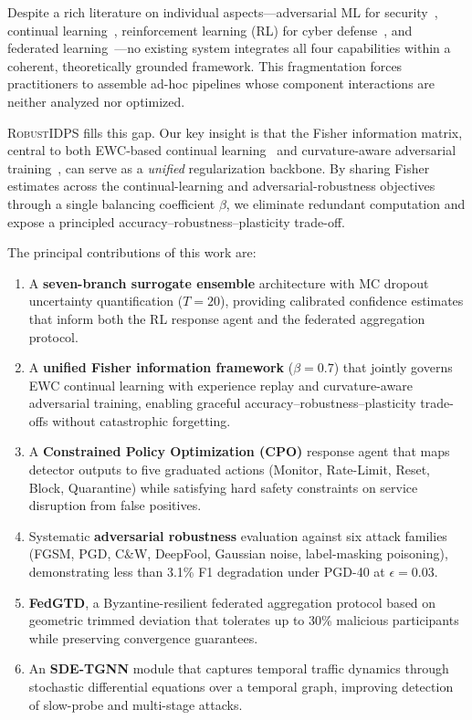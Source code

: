 \documentclass[journal,twoside]{IEEEtran}
\begin{document}
Despite a rich literature on individual aspects---adversarial ML for
security~\cite{apruzzese2023real}, continual
learning~\cite{delange2021continual}, reinforcement learning (RL) for cyber
defense~\cite{nguyen2021deep}, and federated
learning~\cite{mcmahan2017communication}---no existing system integrates all
four capabilities within a coherent, theoretically grounded framework. This
fragmentation forces practitioners to assemble ad-hoc pipelines whose
component interactions are neither analyzed nor optimized.

\textsc{RobustIDPS} fills this gap. Our key insight is that the Fisher
information matrix, central to both EWC-based continual
learning~\cite{kirkpatrick2017overcoming} and curvature-aware adversarial
training~\cite{wu2020adversarial}, can serve as a \emph{unified} regularization
backbone. By sharing Fisher estimates across the continual-learning and
adversarial-robustness objectives through a single balancing coefficient
$\beta$, we eliminate redundant computation and expose a principled
accuracy--robustness--plasticity trade-off.

The principal contributions of this work are:

\begin{enumerate}
  \item A \textbf{seven-branch surrogate ensemble} architecture with MC dropout
        uncertainty quantification ($T{=}20$), providing calibrated confidence
        estimates that inform both the RL response agent and the federated
        aggregation protocol.

  \item A \textbf{unified Fisher information framework} ($\beta{=}0.7$) that
        jointly governs EWC continual learning with experience replay and
        curvature-aware adversarial training, enabling graceful
        accuracy--robustness--plasticity trade-offs without catastrophic
        forgetting.

  \item A \textbf{Constrained Policy Optimization (CPO)} response agent that
        maps detector outputs to five graduated actions (Monitor, Rate-Limit,
        Reset, Block, Quarantine) while satisfying hard safety constraints on
        service disruption from false positives.

  \item Systematic \textbf{adversarial robustness} evaluation against six
        attack families (FGSM, PGD, C\&W, DeepFool, Gaussian noise,
        label-masking poisoning), demonstrating less than 3.1\% F1 degradation
        under PGD-40 at $\epsilon{=}0.03$.

  \item \textbf{FedGTD}, a Byzantine-resilient federated aggregation protocol
        based on geometric trimmed deviation that tolerates up to 30\% malicious
        participants while preserving convergence guarantees.

  \item An \textbf{SDE-TGNN} module that captures temporal traffic dynamics
        through stochastic differential equations over a temporal graph,
        improving detection of slow-probe and multi-stage attacks.
\end{enumerate}
\end{document}
